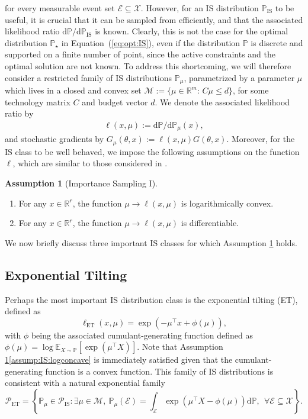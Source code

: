 \documentclass[11pt,a4paper]{article}
\theoremstyle{definition}
\newtheorem{assumption}[theorem]{Assumption}
\DeclareMathOperator*{\IS}{IS}
\DeclareMathOperator*{\ET}{ET}
\newcommand{\set}[2]{\left\{ #1 : #2 \right\}}
\newcommand{\mc}{\mathcal}
\newcommand{\mb}{\mathbb}
\renewcommand{\d}{{\mathrm d}}
\newcommand{\defn}{:=}
\begin{document}
for every measurable event set $\mc E\subseteq \mc X$.
However, for an IS distribution $\mathbb{P}_{\IS}$ to be useful, it is crucial that it can be sampled from efficiently, and that the associated likelihood ratio ${\mathrm{d} \mathbb{P}}/{\mathrm{d} \mathbb{P}_{\IS}}$ is known. Clearly, this is not the case for the optimal distribution $\mathbb P_\star$ in Equation~(\ref{eq:opt:IS}), even if the distribution $\mathbb P$ is discrete and supported on a finite number of point, since the active constraints and the optimal solution are not known.
To address this shortcoming, we will therefore consider a restricted family of IS distributions $\mathbb P_\mu$, parametrized by a parameter $\mu$ which lives in a closed and convex set $\mathcal M:=\{\mu \in \mathbb R^m:\, C \mu \leq d\}$, for some technology matrix $C$ and budget vector $d$. We denote the associated likelihood ratio by
\begin{align*}
    \ell(x, \mu)\defn {\mathrm{d} \mathbb P}/{\mathrm{d} \mathbb P_{\mu}}(x),
\end{align*}
and stochastic gradients by $G_{\mu}(\theta, x) \defn \ell(x, \mu) G(\theta, x)$. Moreover, for the IS class to be well behaved, we impose the following assumptions on the function $\ell$, which are similar to those considered in \citep{Bardou2009computing}.

\begin{assumption}[Importance Sampling I]~
\label{assump:IS:class}
\begin{enumerate}[label=(\roman*)]
    \item \label{assump:IS:logconcave} For any $x \in \mathbb R^r$, the function $\mu \to \ell(x,\mu)$ is logarithmically convex.
    \item \label{assump:IS:differntiable} For any $x \in \mathbb R^r$, the function $\mu \to \ell(x,\mu)$ is differentiable. 
\end{enumerate}
\end{assumption}

\noindent We now briefly discuss three important IS classes for which Assumption \ref{assump:IS:class} holds.

\subsection{Exponential Tilting}
\label{sec:example:ECM}
Perhaps the most important IS distribution class is the exponential tilting (ET), defined as
\begin{equation}
\label{eq:exponential:IS}
    \ell_{\ET}(x,\mu) = \exp(-\mu^\top x + \phi(\mu)),
\end{equation}
with $\phi$ being the associated cumulant-generating function defined as $\phi(\mu) = \log \mathbb E_{X \sim \mathbb P}[ \exp(\mu^\top X) ]$.
Note that Assumption \ref{assump:IS:class}\ref{assump:IS:logconcave} is immediately satisfied given that the cumulant-generating function is a convex function.
This family of IS distributions is consistent with a natural exponential family
\[
  \mc P_{\ET} = \set{\mb P_\mu\in \mc P_{\IS}}{\exists \mu\in \mc M, ~\mb P_\mu(\mc E) = \int_{\mc E}  \exp(\mu^\top X - \phi(\mu)) \d \mb P, ~~\forall \mc E\subseteq \mc X}.
\]
\end{document}
